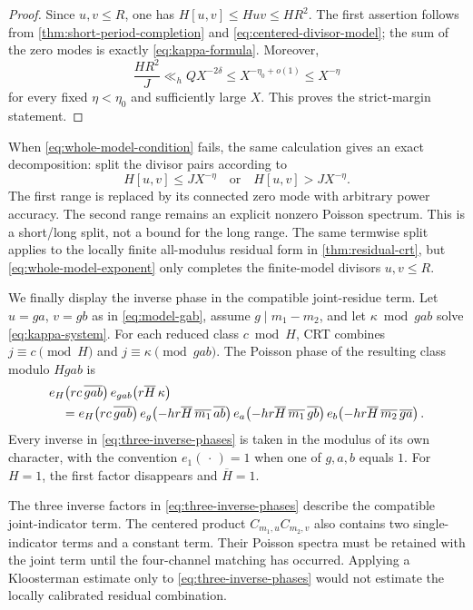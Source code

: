 \begin{proof}
Since \(u,v\le R\), one has
\(H[u,v]\le Huv\le HR^2\).  The first assertion follows from
\cref{thm:short-period-completion} and
\eqref{eq:centered-divisor-model}; the sum of the zero modes is exactly
\eqref{eq:kappa-formula}.  Moreover,
\[
 \frac{HR^2}{J}\ll_h QX^{-2\delta}
 \le X^{-\eta_0+o(1)}\le X^{-\eta}
\]
for every fixed \(\eta<\eta_0\) and sufficiently large \(X\).  This
proves the strict-margin statement.
\end{proof}

When \eqref{eq:whole-model-condition} fails, the same calculation gives
an exact decomposition: split the divisor pairs according to
\begin{equation}
 H[u,v]\le JX^{-\eta}
 \quad\text{or}\quad
 H[u,v]>JX^{-\eta}.
 \label{eq:short-long-split}
\end{equation}
The first range is replaced by its connected zero mode with arbitrary
power accuracy.  The second range remains an explicit nonzero Poisson
spectrum.  This is a short/long split, not a bound for the long range.  The
same termwise split applies to the locally finite all-modulus residual
form in \cref{thm:residual-crt}, but \eqref{eq:whole-model-exponent}
only completes the finite-model divisors \(u,v\le R\).

We finally display the inverse phase in the compatible joint-residue
term.  Let \(u=ga\), \(v=gb\) as in \eqref{eq:model-gab}, assume
\(g\mid m_1-m_2\), and let \(\kappa\bmod gab\) solve
\eqref{eq:kappa-system}.  For each reduced class \(c\bmod H\), CRT
combines \(j\equiv c\pmod H\) and \(j\equiv\kappa\pmod{gab}\).  The
Poisson phase of the resulting class modulo \(Hgab\) is
\begin{align}
 &e_H\!\left(rc\,\overline{gab}\right)
 e_{gab}\!\left(r\overline H\,\kappa\right)
 \notag\\
 &\quad={}
 e_H\!\left(rc\,\overline{gab}\right)
 e_g\!\left(-hr\overline H\,\overline{m_1}\,\overline{ab}\right)
 e_a\!\left(-hr\overline H\,\overline{m_1}\,\overline{gb}\right)
 e_b\!\left(-hr\overline H\,\overline{m_2}\,\overline{ga}\right).
 \label{eq:three-inverse-phases}
\end{align}
Every inverse in \eqref{eq:three-inverse-phases} is taken in the
modulus of its own character, with the convention
\(e_1(\,\cdot\,)=1\) when one of \(g,a,b\) equals \(1\).  For \(H=1\),
the first factor disappears and \(\overline H=1\).

\begin{remark}
The three inverse factors in \eqref{eq:three-inverse-phases} describe
the compatible joint-indicator term.  The centered product
\(C_{m_1,u}C_{m_2,v}\) also contains two single-indicator terms and a
constant term.  Their Poisson spectra must be retained with the joint
term until the four-channel matching has occurred.  Applying a
Kloosterman estimate only to \eqref{eq:three-inverse-phases} would not
estimate the locally calibrated residual combination.
\end{remark}

